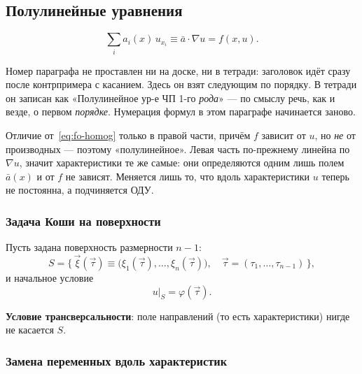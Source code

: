 \subsection{Полулинейные уравнения}

\begin{equation}\tag{1}\label{eq:semilin}
  \sum_{i} a_i(x)\, u_{x_i} \equiv \bar a \cdot \nabla u = f(x, u) .
\end{equation}

\begin{warn}
Номер параграфа не проставлен ни на доске, ни в тетради: заголовок идёт сразу
после контрпримера с касанием. Здесь он взят следующим по порядку. В тетради
он записан как «Полулинейное ур-е ЧП 1-го \emph{рода}» — по смыслу речь, как и
везде, о первом \emph{порядке}. Нумерация формул в этом параграфе начинается
заново.
\end{warn}

\begin{idea}
Отличие от~\eqref{eq:fo-homog} только в правой части, причём $f$ зависит от $u$,
но \emph{не} от производных — поэтому «полулинейное». Левая часть по-прежнему
линейна по $\nabla u$, значит характеристики те же самые: они определяются одним
лишь полем $\bar a(x)$ и от $f$ не зависят. Меняется лишь то, что вдоль
характеристики $u$ теперь не постоянна, а подчиняется ОДУ.
\end{idea}

\subsubsection*{Задача Коши на поверхности}

Пусть задана поверхность размерности $n-1$:
\[
  S = \Big\{\, \vec\xi(\vec\tau) \equiv
      \big(\xi_1(\vec\tau),\dots,\xi_n(\vec\tau)\big), \quad
      \vec\tau = (\tau_1,\dots,\tau_{n-1}) \,\Big\} ,
\]
и начальное условие
\[
  u|_S = \varphi(\vec\tau) .
\]

\begin{definition}
\textbf{Условие трансверсальности}: поле направлений (то есть характеристики)
нигде не касается $S$.
\end{definition}


\subsubsection*{Замена переменных вдоль характеристик}


